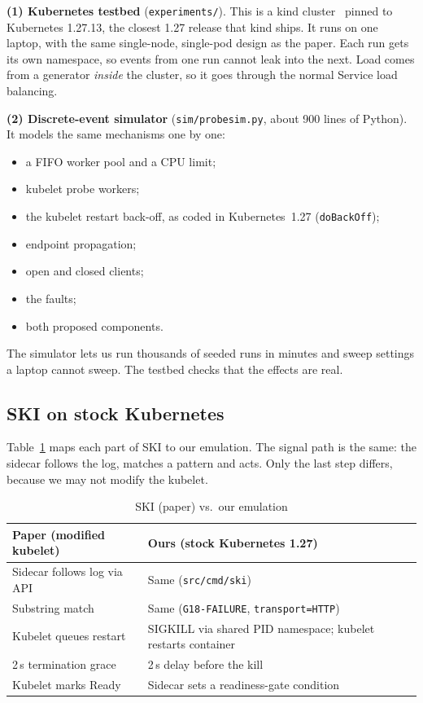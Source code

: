 \documentclass[conference]{IEEEtran}
\begin{document}
\textbf{(1) Kubernetes testbed} (\texttt{experiments/}). This is a kind
cluster~\cite{kind} pinned to Kubernetes 1.27.13, the closest 1.27
release that kind ships. It runs on one laptop, with the same
single-node, single-pod design as the paper. Each run gets its own
namespace, so events from one run cannot leak into the next. Load comes
from a generator \emph{inside} the cluster, so it goes through the
normal Service load balancing.

\textbf{(2) Discrete-event simulator} (\texttt{sim/probesim.py}, about
900 lines of Python). It models the same mechanisms one by one:
\begin{itemize}
\item a FIFO worker pool and a CPU limit;
\item kubelet probe workers;
\item the kubelet restart back-off, as coded in Kubernetes~1.27
  (\texttt{doBackOff});
\item endpoint propagation;
\item open and closed clients;
\item the faults;
\item both proposed components.
\end{itemize}
The simulator lets us run thousands of seeded runs in minutes and sweep
settings a laptop cannot sweep. The testbed checks that the effects are
real.

\subsection{SKI on stock Kubernetes}
Table~\ref{tab:ski} maps each part of SKI to our emulation. The signal
path is the same: the sidecar follows the log, matches a pattern and
acts. Only the last step differs, because we may not modify the kubelet.

\begin{table}[t]
\centering
\caption{SKI (paper) vs.\ our emulation}
\label{tab:ski}
\footnotesize
\begin{tabular}{@{}p{3.3cm}p{4.3cm}@{}}
\toprule
Paper (modified kubelet) & Ours (stock Kubernetes 1.27) \\
\midrule
Sidecar follows log via API & Same (\texttt{src/cmd/ski}) \\
Substring match & Same (\texttt{G18-FAILURE}, \texttt{transport=HTTP}) \\
Kubelet queues restart & SIGKILL via shared PID namespace; kubelet restarts container \\
2\,s termination grace & 2\,s delay before the kill \\
Kubelet marks Ready & Sidecar sets a readiness-gate condition~\cite{k8sreadinessgate} \\
\bottomrule
\end{tabular}
\end{table}
\end{document}
